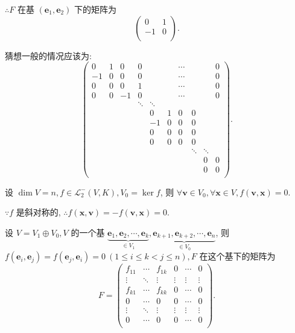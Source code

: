 \documentclass[color=black,device=normal,lang=cn,mode=geye]{elegantnote}
\begin{document}
$\therefore F$ 在基 $(\boldsymbol{e}_1,\boldsymbol{e}_2)$ 下的矩阵为
\[\begin{pmatrix}
    0 & 1 \\
    -1 & 0 \\
\end{pmatrix}.\]

猜想一般的情况应该为:
\[\begin{pmatrix}
    0  & 1 & 0  & 0 &&& \cdots &&& 0 \\
    -1 & 0 & 0  & 0 &&& \cdots &&& 0 \\
    0  & 0 & 0  & 1 &&& \cdots &&& 0 \\
    0  & 0 & -1 & 0 &&& \cdots &&& 0 \\
    &&& \ddots & \ddots \\
    &&&& 0  & 1 & 0 & 0 \\
    &&&& -1 & 0 & 0 & 0 \\
    &&&& 0  & 0 & 0 & 0 \\
    &&&& 0  & 0 & 0 & 0 \\
    &&&&&&& \ddots & \ddots \\
    &&&&&&&& 0 & 0 \\
    &&&&&&&& 0 & 0 \\
\end{pmatrix}.\]

设 $\dim V=n,f\in\mathcal{L}_2^-(V,K),V_0=\ker f$, 则 $\forall\boldsymbol{v}\in V_0,\forall\boldsymbol{x}\in V,f(\boldsymbol{v},\boldsymbol{x})=0$.

$\because f$ 是斜对称的, $\therefore f(\boldsymbol{x},\boldsymbol{v})=-f(\boldsymbol{v},\boldsymbol{x})=0$.

设 $V=V_1\oplus V_0,V$ 的一个基 $\underbrace{\boldsymbol{e}_1,\boldsymbol{e}_2,\cdots,\boldsymbol{e}_k}_{\in V_1},\underbrace{\boldsymbol{e}_{k+1},\boldsymbol{e}_{k+2},\cdots,\boldsymbol{e}_n}_{\in V_0}$, 则 $f(\boldsymbol{e}_i,\boldsymbol{e}_j)=f(\boldsymbol{e}_j,\boldsymbol{e}_i)=0\ (1\leq i \leq k<j\leq n),F$ 在这个基下的矩阵为
\[F=\begin{pmatrix}
    f_{11} & \cdots & f_{1k} & 0 & \cdots & 0 \\
    \vdots & \ddots & \vdots & \vdots & \vdots & \vdots \\
    f_{k1} & \cdots & f_{kk} & 0 & \cdots & 0 \\
    0      & \cdots & 0      & 0 & \cdots & 0 \\
    \vdots & \ddots & \vdots & \vdots & \vdots & \vdots \\
    0      & \cdots & 0      & 0 & \cdots & 0 \\
\end{pmatrix}.\]
\end{document}
